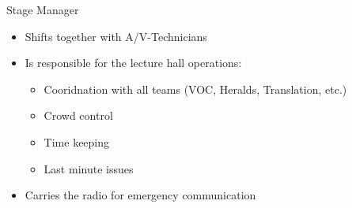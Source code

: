 
\begin{frame}{Stage Manager}
	\begin{itemize}
		\item Shifts together with A/V-Technicians
		\item Is responsible for the lecture hall operations:
		\begin{itemize}
			\item Cooridnation with all teams (VOC, Heralds, Translation, etc.)
			\item Crowd control
			\item Time keeping
			\item Last minute issues
		\end{itemize}
		\item Carries the radio for emergency communication
	\end{itemize}
\end{frame}
